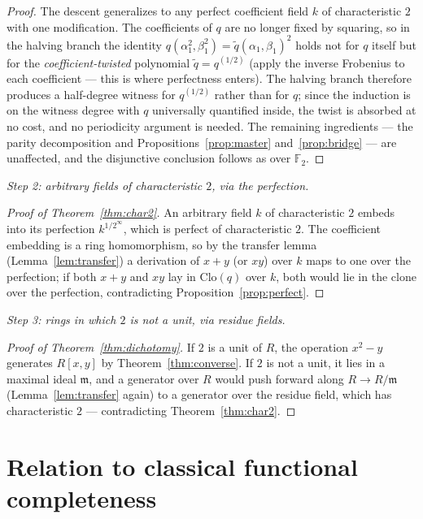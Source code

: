 \documentclass[11pt]{article}
\theoremstyle{definition}
\theoremstyle{remark}
\newcommand{\F}{\mathbb{F}}
\newcommand{\Clo}{\mathrm{Clo}}
\begin{document}
\begin{proof}
The descent generalizes to any perfect coefficient field $k$ of
characteristic $2$ with one modification.  The coefficients of $q$
are no longer fixed by squaring, so in the halving branch the
identity $q(\alpha_1^2, \beta_1^2) = \tilde q(\alpha_1, \beta_1)^2$
holds not for $q$ itself but for the \emph{coefficient-twisted}
polynomial $\tilde q = q^{(1/2)}$ (apply the inverse Frobenius to
each coefficient --- this is where perfectness enters).  The halving
branch therefore produces a half-degree witness for $q^{(1/2)}$
rather than for $q$; since the induction is on the witness degree
with $q$ universally quantified inside, the twist is absorbed at no
cost, and no periodicity argument is needed.  The remaining
ingredients --- the parity decomposition and
Propositions~\ref{prop:master} and~\ref{prop:bridge} --- are
unaffected, and the disjunctive conclusion follows
as over $\F_2$.
\end{proof}

\medskip
\noindent\emph{Step 2: arbitrary fields of characteristic $2$, via
the perfection.}

\begin{proof}[Proof of Theorem~\ref{thm:char2}]
An arbitrary field $k$ of characteristic $2$ embeds into its
perfection $k^{1/2^\infty}$, which is perfect of characteristic $2$.
The coefficient embedding is a ring homomorphism, so by the transfer
lemma (Lemma~\ref{lem:transfer}) a derivation of $x+y$ (or $xy$) over
$k$ maps to one over the perfection; if both $x+y$ and $xy$ lay in
$\Clo(q)$ over $k$, both would lie in the clone over the perfection,
contradicting Proposition~\ref{prop:perfect}.
\end{proof}

\medskip
\noindent\emph{Step 3: rings in which $2$ is not a unit, via residue
fields.}

\begin{proof}[Proof of Theorem~\ref{thm:dichotomy}]
If $2$ is a unit of $R$, the operation $x^2 - y$ generates $R[x,y]$
by Theorem~\ref{thm:converse}.  If $2$ is not a unit, it lies in a
maximal ideal $\mathfrak m$, and a generator over $R$ would
push forward along $R \to R/\mathfrak m$ (Lemma~\ref{lem:transfer}
again) to a generator over the residue field, which has
characteristic $2$ --- contradicting Theorem~\ref{thm:char2}.
\end{proof}

\section{Relation to classical functional completeness}
\label{sec:context}
\end{document}
